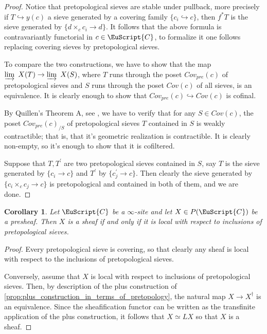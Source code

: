 \documentclass[oneside,a4paper]{amsart}
\newcommand{\euscr}[1]{\EuScript{#1}} %
\newcommand{\ccat}{\euscr{C}} %
\theoremstyle{plain}
\newtheorem{cor}[thm]{Corollary}
\theoremstyle{definition}
\theoremstyle{remark}
\begin{document}
\begin{proof}
Notice that pretopological sieves are stable under pullback, more precisely if $T \hookrightarrow y(c)$ a sieve generated by a covering family $\{ c_{i} \hookrightarrow c \}$, then $f^{*}T$ is the sieve generated by $\{ d \times _{c} c_{i} \rightarrow d \}$. It follows that the above formula is contravariantly functorial in $c \in \ccat$, to formalize it one follows \cite[6.2.2.9]{lurie_higher_topos_theory} replacing covering sieves by pretopological sieves.

To compare the two constructions, we have to show that the map $\varinjlim \ X(T) \rightarrow \varinjlim \ X(S)$, where $T$ runs through the poset $Cov_{pre}(c)$ of pretopological sieves and $S$ runs through the poset $Cov(c)$ of all sieves, is an equivalence. It is clearly enough to show that $Cov_{pre}(c) \hookrightarrow Cov(c)$ is cofinal. 

By Quillen's Theorem A, see \cite[4.1.3.1]{lurie_higher_topos_theory}, we have to verify that for any $S \in Cov(c)$, the poset $Cov_{pre}(c) _{/S}$ of pretopological sieves $T$ contained in $S$ is weakly contractible; that is, that it's geometric realization is contractible. It is clearly non-empty, so it's enough to show that it is cofiltered. 

Suppose that $T, T^{\prime}$ are two pretopological sieves contained in $S$, say $T$ is the sieve generated by $\{ c_{i} \rightarrow c \}$ and $T^\prime$ by $\{ c^\prime _{j} \rightarrow c \}$. Then clearly the sieve generated by $\{ c_{i} \times _{c} c_{j} \rightarrow c \}$ is pretopological and contained in both of them, and we are done. 
\end{proof}

\begin{cor}
\label{cor:sheaves_as_objects_local_with_respect_to_pretopological_sieves}
Let $\ccat$ be a $\infty$-site and let $X \in P(\ccat)$ be a presheaf. Then $X$ is a sheaf if and only if it is local with respect to inclusions of pretopological sieves.
\end{cor}

\begin{proof}
Every pretopological sieve is covering, so that clearly any sheaf is local with respect to the inclusions of pretopological sieves. 

Conversely, assume that $X$ is local with respect to inclusions of pretopological sieves. Then, by description of the plus construction of \cref{prop:plus_construction_in_terms_of_pretopology}, the natural map $X \rightarrow X^{\dagger}$ is an equivalence. Since the sheafification functor can be written as the transfinite application of the plus construction, it follows that $X \simeq LX$ so that $X$ is a sheaf. 
\end{proof}
\end{document}
